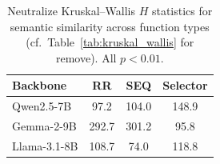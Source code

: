 \begin{table}[t]
\centering
\caption{Neutralize Kruskal--Wallis $H$ statistics for semantic similarity across function types (cf.\ Table~\ref{tab:kruskal_wallis} for remove). All $p < 0.01$.}
\label{tab:neut_kruskal}
\small
\begin{tabular}{lccc}
\toprule
\textbf{Backbone} & \textbf{RR} & \textbf{SEQ} & \textbf{Selector} \\
\midrule
Qwen2.5-7B  & 97.2 & 104.0 & 148.9 \\
Gemma-2-9B  & 292.7 & 301.2 & 95.8 \\
Llama-3.1-8B & 108.7 & 74.0 & 118.8 \\
\bottomrule
\end{tabular}
\end{table}
